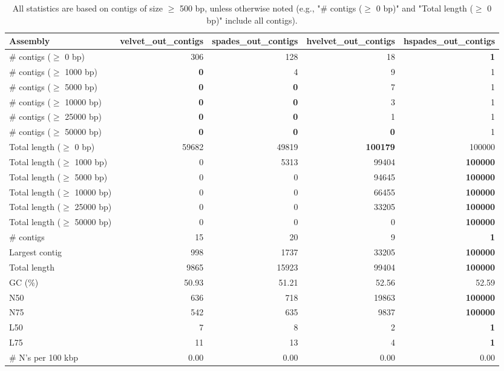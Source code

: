 \documentclass[12pt,a4paper]{article}
\begin{document}
\begin{table}[ht]
\begin{center}
\caption{All statistics are based on contigs of size $\geq$ 500 bp, unless otherwise noted (e.g., "\# contigs ($\geq$ 0 bp)" and "Total length ($\geq$ 0 bp)" include all contigs).}
\begin{tabular}{|l*{4}{|r}|}
\hline
Assembly & velvet\_out\_contigs & spades\_out\_contigs & hvelvet\_out\_contigs & hspades\_out\_contigs \\ \hline
\# contigs ($\geq$ 0 bp) & 306 & 128 & 18 & {\bf 1} \\ \hline
\# contigs ($\geq$ 1000 bp) & {\bf 0} & 4 & 9 & 1 \\ \hline
\# contigs ($\geq$ 5000 bp) & {\bf 0} & {\bf 0} & 7 & 1 \\ \hline
\# contigs ($\geq$ 10000 bp) & {\bf 0} & {\bf 0} & 3 & 1 \\ \hline
\# contigs ($\geq$ 25000 bp) & {\bf 0} & {\bf 0} & 1 & 1 \\ \hline
\# contigs ($\geq$ 50000 bp) & {\bf 0} & {\bf 0} & {\bf 0} & 1 \\ \hline
Total length ($\geq$ 0 bp) & 59682 & 49819 & {\bf 100179} & 100000 \\ \hline
Total length ($\geq$ 1000 bp) & 0 & 5313 & 99404 & {\bf 100000} \\ \hline
Total length ($\geq$ 5000 bp) & 0 & 0 & 94645 & {\bf 100000} \\ \hline
Total length ($\geq$ 10000 bp) & 0 & 0 & 66455 & {\bf 100000} \\ \hline
Total length ($\geq$ 25000 bp) & 0 & 0 & 33205 & {\bf 100000} \\ \hline
Total length ($\geq$ 50000 bp) & 0 & 0 & 0 & {\bf 100000} \\ \hline
\# contigs & 15 & 20 & 9 & {\bf 1} \\ \hline
Largest contig & 998 & 1737 & 33205 & {\bf 100000} \\ \hline
Total length & 9865 & 15923 & 99404 & {\bf 100000} \\ \hline
GC (\%) & 50.93 & 51.21 & 52.56 & 52.59 \\ \hline
N50 & 636 & 718 & 19863 & {\bf 100000} \\ \hline
N75 & 542 & 635 & 9837 & {\bf 100000} \\ \hline
L50 & 7 & 8 & 2 & {\bf 1} \\ \hline
L75 & 11 & 13 & 4 & {\bf 1} \\ \hline
\# N's per 100 kbp & 0.00 & 0.00 & 0.00 & 0.00 \\ \hline
\end{tabular}
\end{center}
\end{table}
\end{document}

